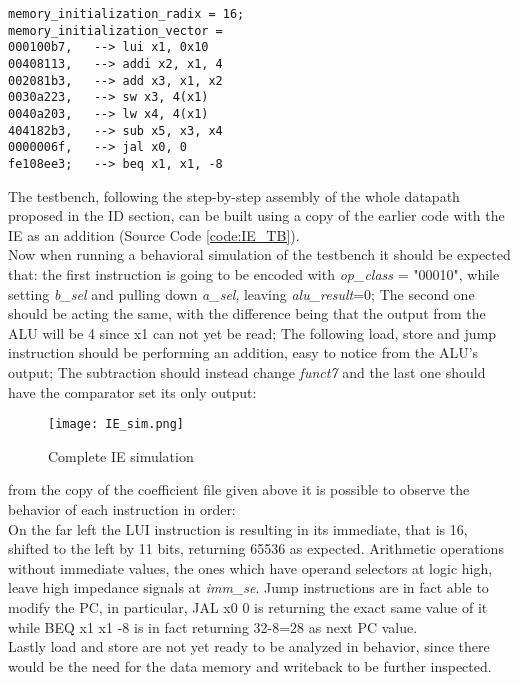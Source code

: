 \begin{verbatim}
memory_initialization_radix = 16;
memory_initialization_vector =
000100b7,   --> lui x1, 0x10
00408113,   --> addi x2, x1, 4
002081b3,   --> add x3, x1, x2
0030a223,   --> sw x3, 4(x1)
0040a203,   --> lw x4, 4(x1)
404182b3,   --> sub x5, x3, x4
0000006f,   --> jal x0, 0 
fe108ee3;   --> beq x1, x1, -8
\end{verbatim}

The testbench, following the step-by-step assembly of the whole datapath proposed in the ID section, can be built using a copy of the earlier code with the IE as an addition (Source Code \ref{code:IE_TB}).\\
Now when running a behavioral simulation of the testbench it should be expected that: the first instruction is going to be encoded with \emph{op{\_}class} = "00010", while setting \emph{b{\_}sel} and pulling down \emph{a{\_}sel}, leaving \emph{alu{\_}result}=0; The second one should be acting the same, with the difference being that the output from the ALU will be 4 since x1 can not yet be read; The following load, store and jump instruction should be performing an addition, easy to notice from the ALU's output; The subtraction should instead change \emph{funct7} and the last one should have the comparator set its only output:

\begin{figure}[ht]
    \centering
    \texttt{[image: IE\_sim.png]}
    \caption{Complete IE simulation}
    \label{fig:IE_sim}
\end{figure}

from the copy of the coefficient file given above it is possible to observe the behavior of each instruction in order: \\
On the far left the LUI instruction is resulting in its immediate, that is 16, shifted to the left by 11 bits, returning 65536 as expected. 
Arithmetic operations without immediate values, the ones which have operand selectors at logic high, leave high impedance signals at \emph{imm{\_}se}.
Jump instructions are in fact able to modify the PC, in particular, JAL x0 0 is returning the exact same value of it while BEQ x1 x1 -8 is in fact returning 32-8=28 as next PC value.\\
Lastly load and store are not yet ready to be analyzed in behavior, since there would be the need for the data memory and writeback to be further inspected.

